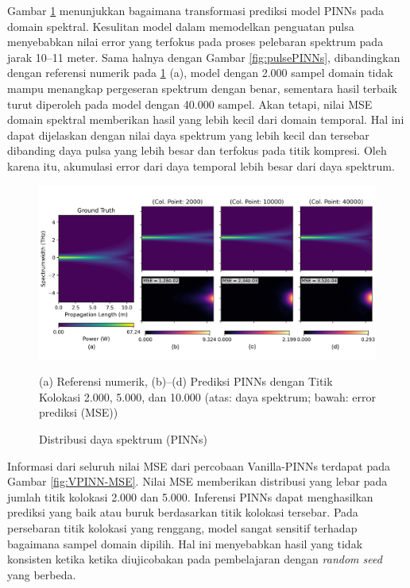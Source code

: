 Gambar \ref{fig:specPINNs} menunjukkan bagaimana transformasi prediksi model PINNs pada domain spektral. Kesulitan model dalam memodelkan penguatan pulsa menyebabkan nilai error yang terfokus pada proses pelebaran spektrum pada jarak 10--11 meter. Sama halnya dengan Gambar \ref{fig:pulsePINNs}, dibandingkan dengan referensi numerik pada \ref{fig:specPINNs} (a), model dengan 2.000 sampel domain tidak mampu menangkap pergeseran spektrum dengan benar, sementara hasil terbaik turut diperoleh pada model dengan 40.000 sampel. Akan tetapi, nilai MSE domain spektral memberikan hasil yang lebih kecil dari domain temporal. Hal ini dapat dijelaskan dengan nilai daya spektrum yang lebih kecil dan tersebar dibanding daya pulsa yang lebih besar dan terfokus pada titik kompresi. Oleh karena itu, akumulasi error dari daya temporal lebih besar dari daya spektrum.

\begin{figure}[htbp]
    \centering
    \includegraphics[width=0.9 \linewidth]{Gambar/resultsVanillaS.png}
    \caption{Distribusi daya spektrum (PINNs)}
    (a) Referensi numerik, (b)–(d) Prediksi PINNs dengan Titik Kolokasi 2.000, 5.000, dan 10.000 (atas: daya spektrum; bawah: error prediksi (MSE))
    \label{fig:specPINNs}
\end{figure}

Informasi dari seluruh nilai MSE dari percobaan Vanilla-PINNs terdapat pada Gambar \ref{fig:VPINN-MSE}. Nilai MSE memberikan distribusi yang lebar pada jumlah titik kolokasi 2.000 dan 5.000. Inferensi PINNs dapat menghasilkan prediksi yang baik atau buruk berdasarkan titik kolokasi tersebar. Pada persebaran titik kolokasi yang renggang, model sangat sensitif terhadap bagaimana sampel domain dipilih. Hal ini menyebabkan hasil yang tidak konsisten ketika ketika diujicobakan pada pembelajaran dengan \emph{random seed} yang berbeda.

\newpage

